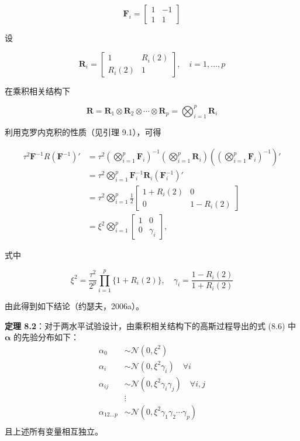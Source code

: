 \documentclass{ctexart}
\begin{document}
\begin{equation*}
\boldsymbol{F}_i=\begin{bmatrix}1&-1\\1&1\end{bmatrix}
\end{equation*}

设

\begin{equation*}
\boldsymbol{R}_i=\begin{bmatrix}1&R_i(2)\\R_i(2)&1\end{bmatrix},\quad i=1,\dots,p
\end{equation*}

在乘积相关结构下

\begin{equation*}
\boldsymbol{R}=\boldsymbol{R}_1\otimes \boldsymbol{R}_2\otimes\cdots\otimes \boldsymbol{R}_p=\bigotimes_{i=1}^{p}\boldsymbol{R}_i
\end{equation*}

利用克罗内克积的性质（见引理 9.1），可得

\begin{align*}
\tau^2\boldsymbol{F}^{-1}R(\boldsymbol{F}^{-1})'&=\tau^2\left(\bigotimes_{i=1}^{p}\boldsymbol{F}_i\right)^{-1}\left(\bigotimes_{i=1}^{p}\boldsymbol{R}_i\right)\left(\left(\bigotimes_{i=1}^{p}\boldsymbol{F}_i\right)^{-1}\right)'\\
&=\tau^2\bigotimes_{i=1}^{p}\boldsymbol{F}_i^{-1}\boldsymbol{R}_i(\boldsymbol{F}_i^{-1})'\\
&=\tau^2\bigotimes_{i=1}^{p}\frac12\begin{bmatrix}1+R_i(2)&0\\0&1-R_i(2)\end{bmatrix}\\
&=\xi^2\bigotimes_{i=1}^{p}\begin{bmatrix}1&0\\0&\gamma_i\end{bmatrix},
\end{align*}

式中

\begin{equation*}
\xi^2=\frac{\tau^2}{2^p}\prod_{i=1}^{p}\{1+R_i(2)\},\quad\gamma_i=\frac{1-R_i(2)}{1+R_i(2)}
\end{equation*}

由此得到如下结论（约瑟夫，2006a）。

\begin{mdquote}
\textbf{定理 8.2}：对于两水平试验设计，由乘积相关结构下的高斯过程导出的式 (8.6) 中 $\boldsymbol{\alpha}$ 的先验分布如下：\begin{align*}\alpha_0&\sim\mathcal{N}(0,\xi^2)\\\alpha_i&\sim\mathcal{N}(0,\xi^2\gamma_i)\quad\forall i\\\alpha_{ij}&\sim\mathcal{N}(0,\xi^2\gamma_i\gamma_j)\quad\forall i,j\\&\vdots\\\alpha_{12\dots p}&\sim\mathcal{N}(0,\xi^2\gamma_1\gamma_2\cdots\gamma_p)\\\end{align*} 且上述所有变量相互独立。
\end{mdquote}
\end{document}
